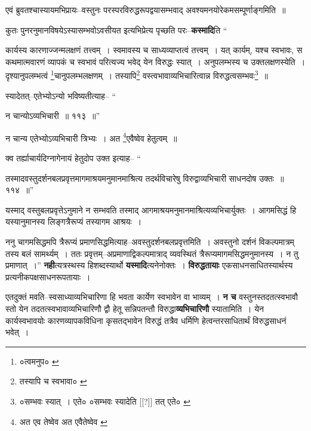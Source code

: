 \documentclass[article,12pt,a4paper]{memoir}
\begin{document}
	  \pstart एवं ब्रुवतश्चास्यायमभिप्रायः--वस्तुनः परस्परविरुद्धरूपद्वयासम्भवाद् अवश्यमनयोरेकमसम्पूर्णाङ्गमिति ॥
	\pend
      

	  \pstart कुतः पुनरनुमानविषयेऽस्यासम्भवोऽवसीयत इत्यभिप्रेत्य पृच्छति परः--\textbf{कस्मादि}ति  \leavevmode{} “
	  
	कार्यस्य कारणाज्जन्मलक्षणं तत्त्वम् । स्वमावस्य च साध्यव्याप्तत्वं तत्त्वम् । यत् कार्यम्, यश्च स्वभावः, स कथमात्मवारणं व्यापकं च स्वभावं परित्यज्य भवेद् येन विरुद्धः स्यात् । अनुपलम्भस्य च उक्तलक्षणस्येति । दृश्यानुपलम्भत्वं \footnote{०त्वमनुप० \cite{dp-msA} \cite{dp-msB} \cite{dp-msC} \cite{dp-edP} \cite{dp-edH} \cite{dp-edE} \cite{dp-edN}}\-चानुपलम्भलक्षणम् । तस्यापि\footnote{तस्यापि च स्वभावा० \cite{dp-msA} \cite{dp-msB} \cite{dp-edP} \cite{dp-edH}} वस्त्वभावाव्यभिचारित्वान्न विरुद्धत्वसम्भवः\footnote{०सम्भवः स्यात् । एते० \cite{dp-msA} \cite{dp-edP} \cite{dp-edH} ०सम्भवः स्यादेति [[?]] तत् एते० \cite{dp-msB}} ॥ 
	  
	स्यादेतत्--एतेभ्योऽन्यो भविष्यतीत्याह-- “
	  
	न चान्योऽव्यभिचारी ॥ ११३ ॥” 
	  
	न चान्य एतेभ्योऽव्यभिचारी त्रिभ्यः । अत \footnote{अत एव तेष्वेव \cite{dp-msA} \cite{dp-msB} \cite{dp-edP} \cite{dp-edH} \cite{dp-edE} \cite{dp-edN} अत एवैतेष्वेव \cite{dp-msC}}\-एवैष्वेव हेतुत्वम् ॥ 
	  
	क्व तर्ह्याचार्यदिग्नागेनायं हेतुदोप उक्त इत्याह-- “
	  
	तस्मादवस्तुदर्शनबलप्रवृत्तमागमाश्रयमनुमानमाश्रित्य तदर्थविचारेषु विरुद्वाव्यभिचारी साधनदोष उक्तः ॥ ११४ ॥” 
	  
	यस्माद् वस्तुबलप्रवृत्तेऽनुमाने न सम्भवति तस्माद् आगमाश्रयमनुमानमाश्रित्यव्यभिचार्युक्तः । आगमसिद्धं हि यस्यानुमानस्य लिङ्गत्रैरूप्यं तस्यागम आश्रयः । 
	  
	ननु चागमसिद्धमपि त्रैरूप्यं प्रमाणसिद्धमित्याह--अवस्तुदर्शनबलप्रवृत्तमिति । अवस्तुनो दर्शनं विकल्पमात्रम् तस्य बलं सामर्थ्यम् । ततः प्रवृत्तम्--अप्रमाणाद्विकल्पमात्राद् व्यवस्थितं त्रैरूप्यमागमसिद्धमनुमानस्य । न तु प्रमाणात् ।” \textbf{नही}त्यत्रस्थस्य हिशब्दस्यार्थो \textbf{यस्मादि}त्यनेनोक्तः । \textbf{विरुद्धतायाः} एकसाधनसाधितस्यार्थस्य प्रत्यनीकपक्षसाधनरूपतायाः ।
	\pend
      

	  \pstart एतदुक्तं मवति--स्वसाध्याव्यभिचारिणा हि भवता कार्येण स्वभावेन वा भाव्यम् । \textbf{न च} वस्तुनस्तदतत्स्वभावौ स्तो येन तदतत्स्वभावाव्यभिचारिणौ द्वौ हेतू सन्निपतन्तौ विरुद्धा\textbf{व्यभिचारिणौ} स्यातामिति । येन कार्यस्वभावयोः कारणव्यापकविधिना कृसतद्भावेन विरुद्धं तत्रैव धर्मिणि हेत्वन्तरसाधितार्थं विरुद्धसाधनं भवेत् ।
	\pend
      
\end{document}

